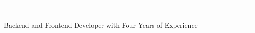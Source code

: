 \documentclass[10pt,A4]{article}
\begin{document}
\setlength{\columnsep}{0.5cm}
\setlength{\columnseprule}{4pt}

\begin{paracol}{2}
\begin{leftcolumn}

\begin{center}
\end{center} 

\begin {center}
	\LARGE{ \textbf{ \uppercase{ \gfullname } } } \\[-10pt]
	\textcolor{red}{ \rule{0.1\textwidth}{1.25pt} } \\[10pt]
	\large{ Backend and Frontend Developer with Four Years of Experience }
\end {center}

\\[6pt]
\\[6pt]
\\[6pt]
\\[6pt]



\end{leftcolumn}
\end{paracol}
\end{document}
